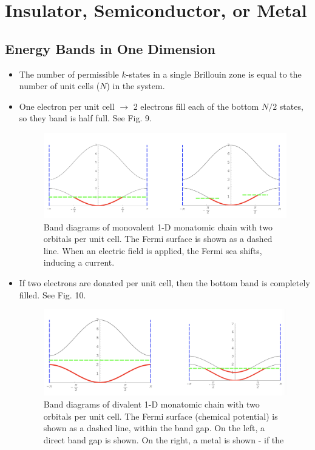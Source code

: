 \documentclass[10pt]{article}
\begin{document}
\section{Insulator, Semiconductor, or Metal}
\subsection{Energy Bands in One Dimension}
\begin{itemize}
  \item The number of permissible $k$-states in a single Brillouin zone is equal to the number of unit cells ($N$) in the system.
  \item One electron per unit cell $\rightarrow$ 2 electrons fill each of the bottom $N/2$ states, so they band is half full. See Fig. 9.
  \begin{figure}
    \centering
      \includegraphics[width=\textwidth]{tb9}
      \caption{Band diagrams of monovalent 1-D monatomic chain with two orbitals per unit cell. The Fermi surface is shown as a dashed line. When
      an electric field is applied, the Fermi sea shifts, inducing a current. }
  \end{figure}
  \item If two electrons are donated per unit cell, then the bottom band is completely filled. See Fig. 10.
  \begin{figure}
    \centering
      \includegraphics[width=\textwidth]{tb10}
      \caption{Band diagrams of divalent 1-D monatomic chain with two orbitals per unit cell. The Fermi surface (chemical potential)
       is shown as a dashed line, within the band gap. On the left, a direct band gap is shown. On the right, a metal is shown - if the
}
\end{figure}
\end{itemize}
\end{document}
